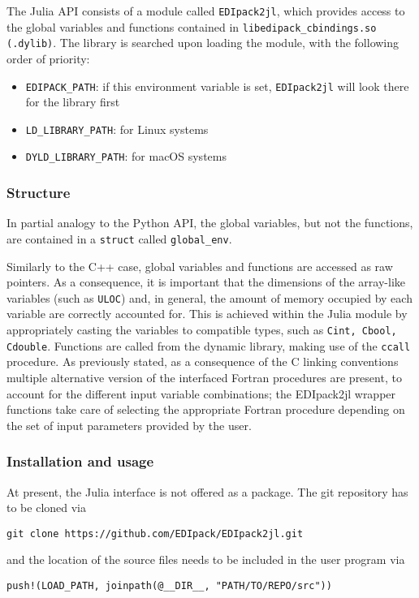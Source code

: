 \documentclass[edipack_sp.tex]{subfiles}
\begin{document}
The \NAME{} Julia API consists of a module called {\tt EDIpack2jl}, which provides access to the global variables and functions contained in {\tt  libedipack\_cbindings.so (.dylib)}. 
The library is searched upon loading the module, with the following order of priority:

\begin{itemize}
\item {\tt EDIPACK\_PATH}: if this environment variable is set, {\tt EDIpack2jl} will look there for the library first
\item {\tt LD\_LIBRARY\_PATH}: for Linux systems
\item {\tt DYLD\_LIBRARY\_PATH}: for macOS systems
\end{itemize}

\subsubsection{Structure}

In partial analogy to the Python API, the global variables, but not the functions, are contained in a  {\tt struct} called {\tt global\_env}.

Similarly to the C++ case, global variables and functions are accessed as raw pointers. As a consequence, it is important that the dimensions of the array-like variables (such as {\tt ULOC}) and, in general, the amount of memory occupied by each variable are correctly accounted for. This is achieved within the Julia module by appropriately casting the variables to compatible types, such as {\tt  Cint, Cbool, Cdouble}.
Functions are called from the dynamic library, making use of the {\tt  ccall} procedure. As previously stated, as a consequence of the C linking conventions multiple alternative version of the interfaced Fortran procedures are present, to account for the different input variable combinations; the EDIpack2jl wrapper functions take care of selecting the appropriate Fortran procedure depending on the set of input parameters provided by the user.

\subsubsection{Installation and usage}

At present, the \NAME Julia interface is not offered as a package. The git repository has to be cloned via

\begin{lstlisting}[style=mybash]
git clone https://github.com/EDIpack/EDIpack2jl.git
\end{lstlisting}
%
and the location of the source files needs to be included in the user program via
\begin{lstlisting}[style=myjulia]
push!(LOAD_PATH, joinpath(@__DIR__, "PATH/TO/REPO/src"))
\end{lstlisting}
\end{document}

